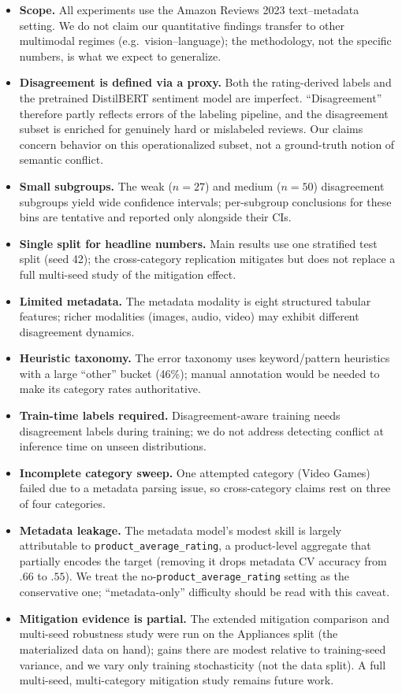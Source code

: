 \documentclass[11pt,a4paper]{article}
\begin{document}
\begin{itemize}[nosep]
  \item \textbf{Scope.} All experiments use the Amazon Reviews 2023 text--metadata setting. We do not claim our quantitative findings transfer to other multimodal regimes (e.g.\ vision--language); the methodology, not the specific numbers, is what we expect to generalize.
  \item \textbf{Disagreement is defined via a proxy.} Both the rating-derived labels and the pretrained DistilBERT sentiment model are imperfect. ``Disagreement'' therefore partly reflects errors of the labeling pipeline, and the disagreement subset is enriched for genuinely hard or mislabeled reviews. Our claims concern behavior on this operationalized subset, not a ground-truth notion of semantic conflict.
  \item \textbf{Small subgroups.} The weak ($n{=}27$) and medium ($n{=}50$) disagreement subgroups yield wide confidence intervals; per-subgroup conclusions for these bins are tentative and reported only alongside their CIs.
  \item \textbf{Single split for headline numbers.} Main results use one stratified test split (seed 42); the cross-category replication mitigates but does not replace a full multi-seed study of the mitigation effect.
  \item \textbf{Limited metadata.} The metadata modality is eight structured tabular features; richer modalities (images, audio, video) may exhibit different disagreement dynamics.
  \item \textbf{Heuristic taxonomy.} The error taxonomy uses keyword/pattern heuristics with a large ``other'' bucket (46\%); manual annotation would be needed to make its category rates authoritative.
  \item \textbf{Train-time labels required.} Disagreement-aware training needs disagreement labels during training; we do not address detecting conflict at inference time on unseen distributions.
  \item \textbf{Incomplete category sweep.} One attempted category (Video Games) failed due to a metadata parsing issue, so cross-category claims rest on three of four categories.
  \item \textbf{Metadata leakage.} The metadata model's modest skill is largely attributable to \texttt{product\_average\_rating}, a product-level aggregate that partially encodes the target (removing it drops metadata CV accuracy from $.66$ to $.55$). We treat the no-\texttt{product\_average\_rating} setting as the conservative one; ``metadata-only'' difficulty should be read with this caveat.
  \item \textbf{Mitigation evidence is partial.} The extended mitigation comparison and multi-seed robustness study were run on the Appliances split (the materialized data on hand); gains there are modest relative to training-seed variance, and we vary only training stochasticity (not the data split). A full multi-seed, multi-category mitigation study remains future work.
\end{itemize}
\end{document}
